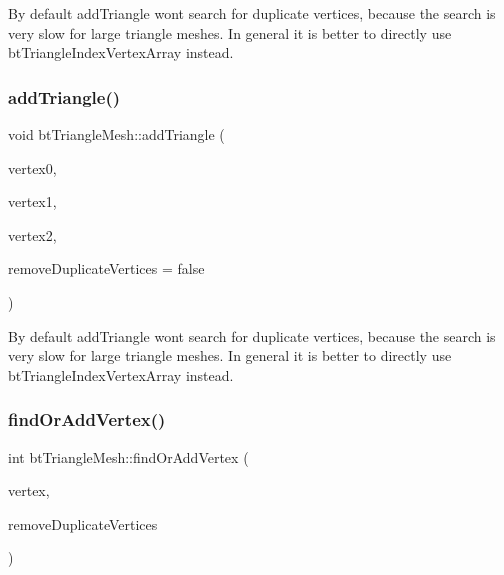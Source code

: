 By default add\+Triangle won\textquotesingle{}t search for duplicate vertices, because the search is very slow for large triangle meshes. In general it is better to directly use bt\+Triangle\+Index\+Vertex\+Array instead. \mbox{\label{classbtTriangleMesh_a28551d57ae59248a210163a504558583}} 
\subsubsection{\texorpdfstring{add\+Triangle()}{addTriangle()}\hspace{0.1cm}{\footnotesize\ttfamily [2/2]}}
{\footnotesize\ttfamily void bt\+Triangle\+Mesh\+::add\+Triangle (\begin{DoxyParamCaption}\item[{const bt\+Vector3 \&}]{vertex0,  }\item[{const bt\+Vector3 \&}]{vertex1,  }\item[{const bt\+Vector3 \&}]{vertex2,  }\item[{bool}]{remove\+Duplicate\+Vertices = {\ttfamily false} }\end{DoxyParamCaption})}

By default add\+Triangle won\textquotesingle{}t search for duplicate vertices, because the search is very slow for large triangle meshes. In general it is better to directly use bt\+Triangle\+Index\+Vertex\+Array instead. \mbox{\label{classbtTriangleMesh_a3b521a1faa5862a818d9f983230749a2}} 
\subsubsection{\texorpdfstring{find\+Or\+Add\+Vertex()}{findOrAddVertex()}}
{\footnotesize\ttfamily int bt\+Triangle\+Mesh\+::find\+Or\+Add\+Vertex (\begin{DoxyParamCaption}\item[{const bt\+Vector3 \&}]{vertex,  }\item[{bool}]{remove\+Duplicate\+Vertices }\end{DoxyParamCaption})}



